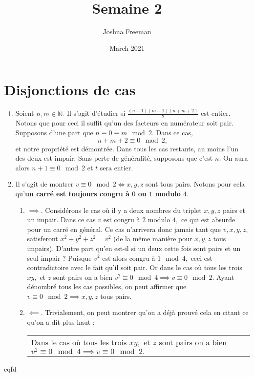 \documentclass[10pt]{article}
\title{Semaine 2}
\author{Joshua Freeman}
\date{March 2021}
\begin{document}
\maketitle
\setcounter{section}{4}
\section{Disjonctions de cas}
\begin{enumerate}
    \item Soient $n,m \in \mathbb{N}.$ Il s'agit d'étudier si $\frac{(n+1)(m+1)(n+m+2)}{2}$ est entier. Notons que pour ceci il suffit qu'un des facteurs en numérateur soit pair. Supposons d'une part que 
    $n\equiv 0 \equiv m \mod 2.$ Dans ce cas, \[n+m+2 \equiv 0 \mod 2,\]
    et notre propriété est démontrée. Dans tous les cas restants, au moins l'un des deux est impair. Sans perte de généralité, supposons que c'est $n.$ On aura alors $n+1 \equiv 0 \mod 2$ et $t$ sera entier.
    \item Il s'agit de montrer $v \equiv 0 \mod 2 \iff x,y,z $ sont tous pairs. Notons pour cela qu'\textbf{un carré est toujours congru à $0$ ou $1$ modulo $4$}.
    \begin{enumerate}
        \item $\implies.$  Considérons le cas où il y a deux nombres du triplet $x,y,z$ pairs et un impair. Dans ce cas $v$ est congru à $2$ modulo $4,$ ce qui est absurde pour un carré en général. Ce cas n'arrivera donc jamais tant que $v,x,y,z, $ satisferont $x^2+y^2+z^2=v^2$ (de la même manière pour $x,y,z$ tous impairs). D'autre part qu'en est-il si un deux cette fois sont pairs et un seul impair ? Puisque $v^2$ est alors congru à $1 \mod 4,$ ceci est contradictoire avec le fait qu'il soit pair. Or dans le cas où tous les trois $xy,$ et $z$ sont pairs on a bien $v^2 \equiv 0 \mod 4 \implies v \equiv 0 \mod 2.$ Ayant dénombré tous les cas possibles, on peut affirmer que $v\equiv 0 \mod 2 \implies x,y,z $ tous pairs.
        \item $\impliedby.$ Trivialement, on peut montrer qu'on a déjà prouvé cela en citant ce qu'on a dit plus haut :
        \\\begin{tabular}{|p{15cm}}
        Dans le cas où tous les trois $xy,$ et $z$ sont pairs on a bien $v^2 \equiv 0 \mod 4 \implies v \equiv 0 \mod 2.$\\
\end{tabular}
    \end{enumerate}
\end{enumerate}
cqfd
\end{document}
